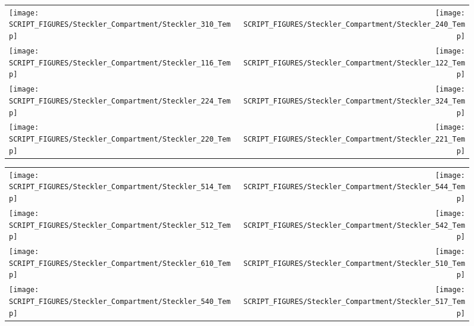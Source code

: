 \begin{figure}[p]
\begin{tabular*}{\textwidth}{l@{\extracolsep{\fill}}r}
\texttt{[image: SCRIPT\_FIGURES/Steckler\_Compartment/Steckler\_310\_Temp]} &
\texttt{[image: SCRIPT\_FIGURES/Steckler\_Compartment/Steckler\_240\_Temp]} \\
\texttt{[image: SCRIPT\_FIGURES/Steckler\_Compartment/Steckler\_116\_Temp]} &
\texttt{[image: SCRIPT\_FIGURES/Steckler\_Compartment/Steckler\_122\_Temp]} \\
\texttt{[image: SCRIPT\_FIGURES/Steckler\_Compartment/Steckler\_224\_Temp]} &
\texttt{[image: SCRIPT\_FIGURES/Steckler\_Compartment/Steckler\_324\_Temp]} \\
\texttt{[image: SCRIPT\_FIGURES/Steckler\_Compartment/Steckler\_220\_Temp]} &
\texttt{[image: SCRIPT\_FIGURES/Steckler\_Compartment/Steckler\_221\_Temp]}
\end{tabular*}
\label{Steckler_Temp_4}
\end{figure}

\begin{figure}[p]
\begin{tabular*}{\textwidth}{l@{\extracolsep{\fill}}r}
\texttt{[image: SCRIPT\_FIGURES/Steckler\_Compartment/Steckler\_514\_Temp]} &
\texttt{[image: SCRIPT\_FIGURES/Steckler\_Compartment/Steckler\_544\_Temp]} \\
\texttt{[image: SCRIPT\_FIGURES/Steckler\_Compartment/Steckler\_512\_Temp]} &
\texttt{[image: SCRIPT\_FIGURES/Steckler\_Compartment/Steckler\_542\_Temp]} \\
\texttt{[image: SCRIPT\_FIGURES/Steckler\_Compartment/Steckler\_610\_Temp]} &
\texttt{[image: SCRIPT\_FIGURES/Steckler\_Compartment/Steckler\_510\_Temp]} \\
\texttt{[image: SCRIPT\_FIGURES/Steckler\_Compartment/Steckler\_540\_Temp]} &
\texttt{[image: SCRIPT\_FIGURES/Steckler\_Compartment/Steckler\_517\_Temp]}
\end{tabular*}
\label{Steckler_Temp_5}
\end{figure}

